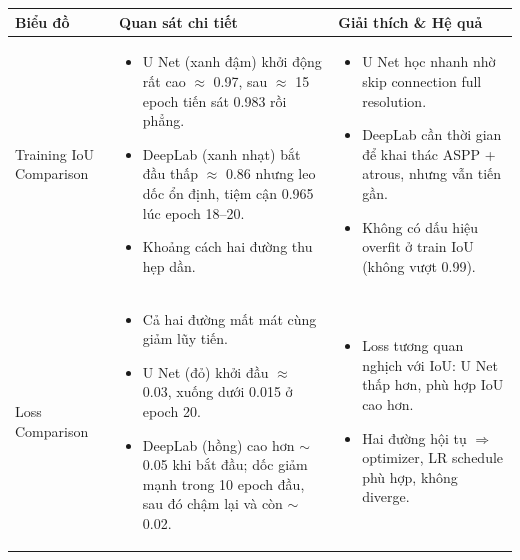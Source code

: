 \documentclass[12pt]{report}
\begin{document}
\begin{table}[h!]
\renewcommand{\arraystretch}{1.3}
\centering
\footnotesize
\begin{tabularx}{\textwidth}{|L{2.2cm}|L{5.8cm}|L{6.5cm}|}
\hline
\textbf{Biểu đồ} & \textbf{Quan sát chi tiết} & \textbf{Giải thích \& Hệ quả} \\
\hline

Training IoU Comparison &
\begin{itemize}[leftmargin=*,itemsep=1pt,parsep=0pt]
    \item U Net (xanh đậm) khởi động rất cao $\approx$ 0.97, sau $\approx$ 15 epoch tiến sát 0.983 rồi phẳng.
    \item DeepLab (xanh nhạt) bắt đầu thấp $\approx$ 0.86 nhưng leo dốc ổn định, tiệm cận 0.965 lúc epoch 18–20.
    \item Khoảng cách hai đường thu hẹp dần.
\end{itemize}
&
\begin{itemize}[leftmargin=*,itemsep=1pt,parsep=0pt]
    \item U Net học nhanh nhờ skip connection full resolution.
    \item DeepLab cần thời gian để khai thác ASPP + atrous, nhưng vẫn tiến gần.
    \item Không có dấu hiệu overfit ở train IoU (không vượt 0.99).
\end{itemize} \\
\hline

Loss Comparison &
\begin{itemize}[leftmargin=*,itemsep=1pt,parsep=0pt]
    \item Cả hai đường mất mát cùng giảm lũy tiến.
    \item U Net (đỏ) khởi đầu $\approx$ 0.03, xuống dưới 0.015 ở epoch 20.
    \item DeepLab (hồng) cao hơn $\sim$0.05 khi bắt đầu; dốc giảm mạnh trong 10 epoch đầu, sau đó chậm lại và còn $\sim$0.02.
\end{itemize}
&
\begin{itemize}[leftmargin=*,itemsep=1pt,parsep=0pt]
    \item Loss tương quan nghịch với IoU: U Net thấp hơn, phù hợp IoU cao hơn.
    \item Hai đường hội tụ $\Rightarrow$ optimizer, LR schedule phù hợp, không diverge.
\end{itemize} \\
\hline


\end{tabularx}
\end{table}
\end{document}
